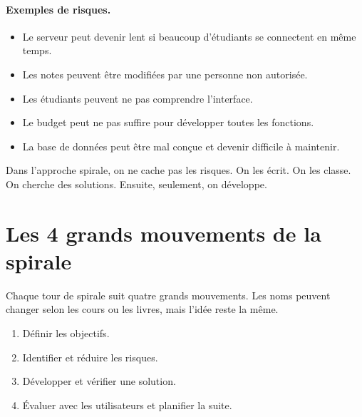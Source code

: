 \documentclass[12pt,a4paper]{article}
\begin{document}
\paragraph{Exemples de risques.}
\begin{itemize}
    \item Le serveur peut devenir lent si beaucoup d'étudiants se connectent en même temps.
    \item Les notes peuvent être modifiées par une personne non autorisée.
    \item Les étudiants peuvent ne pas comprendre l'interface.
    \item Le budget peut ne pas suffire pour développer toutes les fonctions.
    \item La base de données peut être mal conçue et devenir difficile à maintenir.
\end{itemize}

Dans l'approche spirale, on ne cache pas les risques. On les écrit. On les classe. On cherche des solutions. Ensuite, seulement, on développe.

\newpage

\section{Les 4 grands mouvements de la spirale}

Chaque tour de spirale suit quatre grands mouvements. Les noms peuvent changer selon les cours ou les livres, mais l'idée reste la même.

\begin{enumerate}
    \item Définir les objectifs.
    \item Identifier et réduire les risques.
    \item Développer et vérifier une solution.
    \item Évaluer avec les utilisateurs et planifier la suite.
\end{enumerate}
\end{document}

